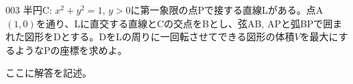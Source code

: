 \begin{prob}{003}{}{}
 半円C: $x^2+y^2=1,\, y>0$に第一象限の点Pで接する直線Lがある。点A$(1,0)$を通り、Lに直交する直線とCの交点をBとし、弦AB, APと弧BPで囲まれた図形をDとする。DをLの周りに一回転させてできる図形の体積$V$を最大にするようなPの座標を求めよ。
\end{prob}
ここに解答を記述。